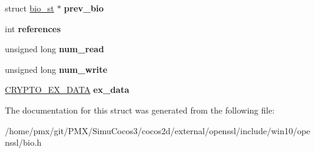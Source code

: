\begin{DoxyCompactItemize}
struct \hyperlink{structbio__st}{bio\+\_\+st} $\ast$ {\bfseries prev\+\_\+bio}
\item 
\mbox{\label{structbio__st_a6b72d783529f2185bb1c452ab6845d5e}} 
int {\bfseries references}
\item 
\mbox{\label{structbio__st_ab70dbdf7e557e771f49b12df73e6a91e}} 
unsigned long {\bfseries num\+\_\+read}
\item 
\mbox{\label{structbio__st_a3b884313deeabd3eb35e693394937a0e}} 
unsigned long {\bfseries num\+\_\+write}
\item 
\mbox{\label{structbio__st_a499ee1071ec22ec4da6086422785a0ca}} 
\hyperlink{structcrypto__ex__data__st}{C\+R\+Y\+P\+T\+O\+\_\+\+E\+X\+\_\+\+D\+A\+TA} {\bfseries ex\+\_\+data}
\end{DoxyCompactItemize}


The documentation for this struct was generated from the following file\+:\begin{DoxyCompactItemize}
\item 
/home/pmx/git/\+P\+M\+X/\+Simu\+Cocos3/cocos2d/external/openssl/include/win10/openssl/bio.\+h\end{DoxyCompactItemize}
